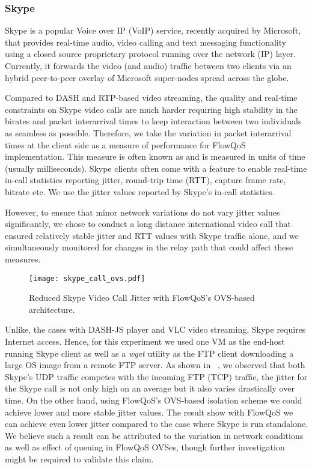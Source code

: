 \subsubsection{Skype}
\label{sec:evaluation:skype}

Skype \cite{skype} is a popular Voice over IP (VoIP) service, recently acquired by Microsoft, that provides real-time audio, video calling and text messaging functionality using a closed source proprietary protocol running over the network (IP) layer. Currently, it forwards the video (and audio) traffic between two clients via an hybrid peer-to-peer overlay of Microsoft super-nodes spread across the globe.

Compared to DASH and RTP-based video streaming, the quality and real-time constraints on Skype video calls are much harder requiring high stability in the birates and packet interarrival times to keep interaction between two individuals as seamless as possible. Therefore, we take the variation in packet interarrival times at the client side as a measure of performance for FlowQoS implementation. This measure is often known as  and is measured in units of time (usually milliseconds). Skype clients often come with a feature to enable real-time in-call statistics reporting jitter, round-trip time (RTT), capture frame rate, bitrate etc. We use the jitter values reported by Skype's in-call statistics.

However, to ensure that minor network variations do not vary jitter values significantly, we chose to conduct a long distance international video call that ensured relatively stable jitter and RTT values with Skype traffic alone, and we simultaneously monitored for changes in the relay path that could affect these measures.

\begin{figure}[t]
    \texttt{[image: skype\_call\_ovs.pdf]}
    \caption{Reduced Skype Video Call Jitter with FlowQoS's OVS-based architecture.}
    \centering
    \label{fig:skype_ovs}
\end{figure}

Unlike, the cases with DASH-JS player and VLC video streaming, Skype requires Internet access. Hence, for this experiment we used one VM as the end-host running Skype client as well as a \textit{wget} \cite{wget} utility as the FTP client downloading a large OS image from a remote FTP server. As shown in ~, we observed that both Skype's UDP traffic competes with the incoming FTP (TCP) traffic, the jitter for the Skype call is not only high on an average but it also varies drastically over time. On the other hand, using FlowQoS's OVS-based isolation scheme we could achieve lower and more stable jitter values. The result show with FlowQoS we can achieve even lower jitter compared to the case where Skype is run standalone. We believe such a result can be attributed to the variation in network conditions as well as effect of queuing in FlowQoS OVSes, though further investigation might be required to validate this claim.


